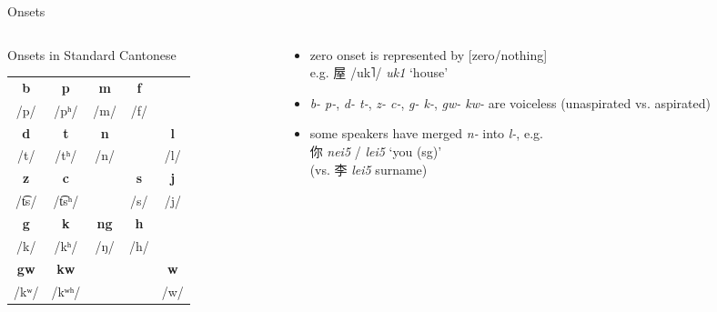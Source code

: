 \documentclass{beamer}
\begin{document}
\begin{frame}[fragile]{Onsets}

\begin{columns}
    \begin{column}{0.5\textwidth}
        Onsets in Standard Cantonese\\
        \bigskip
        \begin{tabular}{c c c c c}
            \hline
            \textbf{b} & \textbf{p} & \textbf{m} & \textbf{f} & \\ 
            /p/ & /pʰ/ & /m/ & /f/ & \\ \hline
            \textbf{d} & \textbf{t} & \textbf{n} & & \textbf{l} \\
            /t/ & /tʰ/ & /n/ & & /l/ \\ \hline
            \textbf{z} & \textbf{c} & & \textbf{s} & \textbf{j} \\
            /t͡s/ & /t͡sʰ/ & & /s/ & /j/ \\ \hline
            \textbf{g} & \textbf{k} & \textbf{ng} & \textbf{h} & \\
            /k/ & /kʰ/ & /ŋ/ & /h/ & \\ \hline
            \textbf{gw} & \textbf{kw} & & & \textbf{w} \\
            /kʷ/ & /kʷʰ/ & & & /w/ \\ \hline
        \end{tabular}
    \end{column}
    \begin{column}{0.5\textwidth} 
        \begin{itemize}
            \item zero onset is represented by [zero/nothing]\\ e.g. 屋 /uk˥/ \emph{uk1} \enquote*{house}
            \item \emph{b- p-}, \emph{d- t-}, \emph{z- c-}, \emph{g- k-}, \emph{gw- kw-} are voiceless (unaspirated vs. aspirated)
            \item some speakers have merged \emph{n-} into \emph{l-}, e.g.\\ 你 \emph{nei5} / \emph{lei5} \enquote*{you (sg)}\\ (vs. 李 \emph{lei5} surname)
        \end{itemize}
    \end{column}
\end{columns}

\end{frame}
\end{document}
